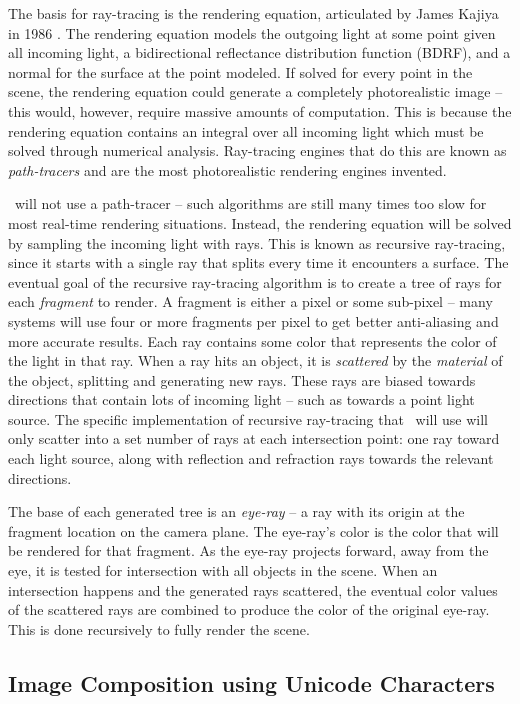 The basis for ray-tracing is the rendering equation, articulated by James Kajiya in 1986 \cite{kajiya1986rendering}.
The rendering equation models the outgoing light at some point given all incoming light, a bidirectional reflectance distribution function (BDRF), and a normal for the surface at the point modeled.
If solved for every point in the scene, the rendering equation could generate a completely photorealistic image -- this would, however, require massive amounts of computation.
This is because the rendering equation contains an integral over all incoming light which must be solved through numerical analysis.
Ray-tracing engines that do this are known as {\it path-tracers} and are the most photorealistic rendering engines invented.

\name\ will not use a path-tracer -- such algorithms are still many times too slow for most real-time rendering situations.
Instead, the rendering equation will be solved by sampling the incoming light with rays.
This is known as recursive ray-tracing, since it starts with a single ray that splits every time it encounters a surface.
The eventual goal of the recursive ray-tracing algorithm is to create a tree of rays for each {\it fragment} to render.
A fragment is either a pixel or some sub-pixel -- many systems will use four or more fragments per pixel to get better anti-aliasing and more accurate results.
Each ray contains some color that represents the color of the light in that ray.
When a ray hits an object, it is {\it scattered} by the {\it material} of the object, splitting and generating new rays.
These rays are biased towards directions that contain lots of incoming light -- such as towards a point light source.
The specific implementation of recursive ray-tracing that \name\ will use will only scatter into a set number of rays at each intersection point: one ray toward each light source, along with reflection and refraction rays towards the relevant directions.

The base of each generated tree is an {\it eye-ray} -- a ray with its origin at the fragment location on the camera plane.
The eye-ray's color is the color that will be rendered for that fragment.
As the eye-ray projects forward, away from the eye, it is tested for intersection with all objects in the scene.
When an intersection happens and the generated rays scattered, the eventual color values of the scattered rays are combined to produce the color of the original eye-ray.
This is done recursively to fully render the scene.


\subsection{Image Composition using Unicode Characters}
\label{ch:intro:overview:unicode}

